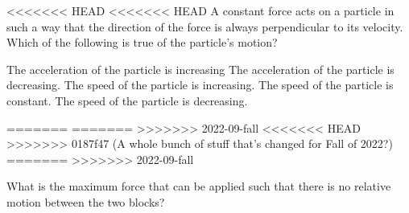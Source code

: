 \documentclass{../../oss-apphys-exam}
\begin{document}
\begin{multicols*}{2}
\begin{questions}
\begin{choices}
\begin{choices}
<<<<<<< HEAD
<<<<<<< HEAD
    \question A constant force acts on a particle in such a way that the
    direction of the force is always perpendicular to its velocity. Which of the
    following is true of the particle's motion?
    \begin{choices}
      \choice The acceleration of the particle is increasing
      \choice The acceleration of the particle is decreasing.
      \choice The speed of the particle is increasing.
      \choice The speed of the particle is constant.
      \choice The speed of the particle is decreasing.
    \end{choices}
    \columnbreak
=======
=======
>>>>>>> 2022-09-fall
<<<<<<< HEAD
>>>>>>> 0187f47 (A whole bunch of stuff that's changed for Fall of 2022?)
=======
>>>>>>> 2022-09-fall


    \question What is the maximum force that can be applied such that there is
    no relative motion between the two blocks?
    \label{stacked1}
    

\end{choices}
\end{choices}
\end{questions}
\end{multicols*}
\end{document}
